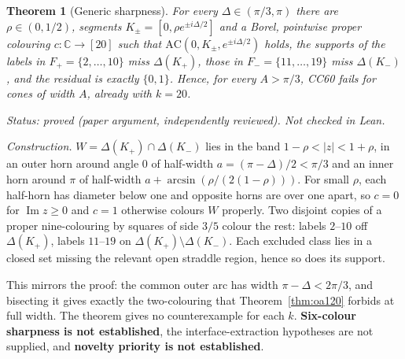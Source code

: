 \documentclass[11pt]{article}
\newtheorem{theorem}{Theorem}[section]
\theoremstyle{definition}
\theoremstyle{remark}
\begin{document}
\begin{theorem}[Generic sharpness]\label{thm:sharp}
For every $\Delta\in(\pi/3,\pi)$ there are $\rho\in(0,1/2)$, segments
$K_\pm=[0,\rho e^{\pm i\Delta/2}]$ and a Borel, pointwise proper colouring
$c:\mathbb C\to[20]$ such that $\mathrm{AC}(0,K_\pm,e^{\pm i\Delta/2})$ holds,
the supports of the labels in $F_+=\{2,\dots,10\}$ miss $\Delta(K_+)$, those
in $F_-=\{11,\dots,19\}$ miss $\Delta(K_-)$, and the residual is exactly
$\{0,1\}$. Hence, for every $A>\pi/3$, CC60 fails for cones of width $A$,
already with $k=20$.
\end{theorem}
\noindent\emph{Status: proved (paper argument, independently reviewed). Not
checked in Lean.}

\emph{Construction.} $W=\Delta(K_+)\cap\Delta(K_-)$ lies in the band
$1-\rho<|z|<1+\rho$, in an outer horn around angle $0$ of half-width
$a=(\pi-\Delta)/2<\pi/3$ and an inner horn around $\pi$ of half-width
$a+\arcsin(\rho/(2(1-\rho)))$. For small $\rho$, each half-horn has diameter
below one and opposite horns are over one apart, so $c=0$ for
$\operatorname{Im}z\ge0$ and $c=1$ otherwise colours $W$ properly. Two
disjoint copies of a proper nine-colouring by squares of side $3/5$ colour
the rest: labels $2$--$10$ off $\Delta(K_+)$, labels $11$--$19$ on
$\Delta(K_+)\setminus\Delta(K_-)$. Each excluded class lies in a closed set
missing the relevant open straddle region, hence so does its support.

This mirrors the proof: the common outer arc has width $\pi-\Delta<2\pi/3$,
and bisecting it gives exactly the two-colouring that
Theorem~\ref{thm:oa120} forbids at full width. The theorem gives no
counterexample for each $k$. \textbf{Six-colour sharpness is not
established}, the interface-extraction hypotheses are not supplied, and
\textbf{novelty priority is not established}.
\end{document}
